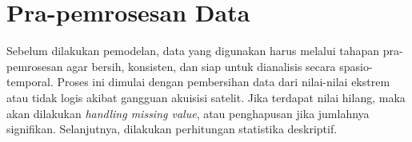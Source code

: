 \section{Pra-pemrosesan Data}
Sebelum dilakukan pemodelan, data yang digunakan harus melalui tahapan pra-pemrosesan agar bersih, konsisten, dan siap untuk dianalisis secara spasio-temporal. Proses ini dimulai dengan pembersihan data dari nilai-nilai ekstrem atau tidak logis akibat gangguan akuisisi satelit. Jika terdapat nilai hilang, maka akan dilakukan \textit{handling missing value}, atau penghapusan jika jumlahnya signifikan. Selanjutnya, dilakukan perhitungan statistika deskriptif. 